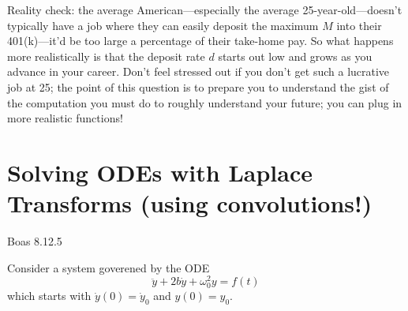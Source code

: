 \documentclass[answers]{exam}\newcommand{\repositoryInformationSetup}{     \usepackage[dvipsnames]{xcolor}     \usepackage[ angle=90, color=black, opacity=1, scale=2, ]{background}      \SetBgPosition{current page.west}      \SetBgVshift{-4.5mm}      \backgroundsetup{contents={{\color{green}\texttt{-{}-} differs from commit \texttt{40a9b87} in 0 files}}} } \newcommand{\commit}{{{\color{green}40a9b87}}}\usepackage{amsmath}
\begin{document}
\begin{questions}
Reality check: the average American---especially the average 25-year-old---doesn't typically have a job where they can easily deposit the maximum $M$ into their 401(k)---it'd be too large a percentage of their take-home pay.
So what happens more realistically is that the deposit rate $d$ starts out low and grows as you advance in your career.
Don't feel stressed out if you don't get such a lucrative job at 25; the point of this question is to prepare you to understand the gist of the computation you must do to roughly understand your future; you can plug in more realistic functions!


 
	\section*{Solving ODEs with Laplace Transforms (using convolutions!)}
	\question Boas 8.12.5

\begin{solution}\end{solution}
 	\question Consider a system goverened by the ODE
\begin{equation}
	\ddot{y} + 2b \dot{y} + \omega_0^2 y = f(t)
\end{equation}
which starts with $\dot{y}(0)=\dot{y}_0$ and $y(0)=y_0$.


\end{questions}
\end{document}
